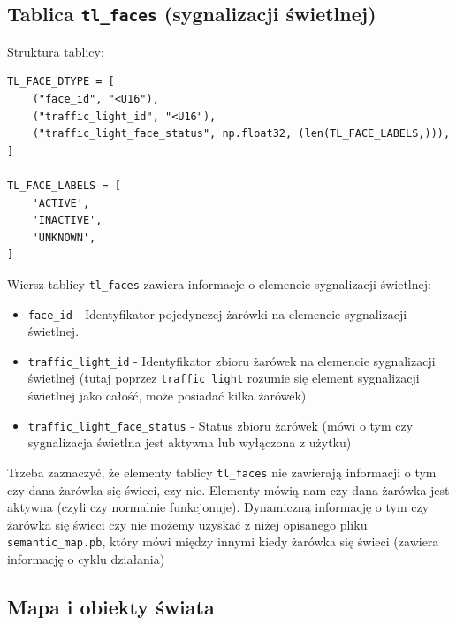 \subsection{Tablica \texttt{tl\_faces} (sygnalizacji świetlnej)}

\noindent
Struktura tablicy:

\begin{verbatim}
TL_FACE_DTYPE = [
    ("face_id", "<U16"),
    ("traffic_light_id", "<U16"),
    ("traffic_light_face_status", np.float32, (len(TL_FACE_LABELS,))),
]

TL_FACE_LABELS = [
    'ACTIVE',
    'INACTIVE',
    'UNKNOWN',
]
\end{verbatim}

\noindent
Wiersz tablicy \texttt{tl\_faces} zawiera informacje o elemencie sygnalizacji świetlnej:

\begin{itemize}
    \setlength{\itemsep}{1pt}
    \setlength{\parskip}{0.2em}
    \setlength{\parsep}{0.2em}
    \item \texttt{face\_id} - Identyfikator pojedynczej żarówki na elemencie sygnalizacji świetlnej.
    \item \texttt{traffic\_light\_id} - Identyfikator zbioru żarówek na elemencie sygnalizacji świetlnej (tutaj poprzez \texttt{traffic\_light} rozumie się element sygnalizacji świetlnej jako całość, może posiadać kilka żarówek)
    \item \texttt{traffic\_light\_face\_status} - Status zbioru żarówek (mówi o tym czy sygnalizacja świetlna jest aktywna lub wyłączona z użytku)
\end{itemize}

\noindent
Trzeba zaznaczyć, że elementy tablicy \texttt{tl\_faces} nie zawierają informacji o tym czy dana żarówka się świeci, czy nie. Elementy mówią nam czy dana żarówka jest aktywna (czyli czy normalnie funkcjonuje). Dynamiczną informację o tym czy żarówka się świeci czy nie możemy uzyskać z niżej opisanego pliku \texttt{semantic\_map.pb}, który mówi między innymi kiedy żarówka się świeci (zawiera informację o cyklu działania)
\newpage

\subsection{Mapa i obiekty świata}

